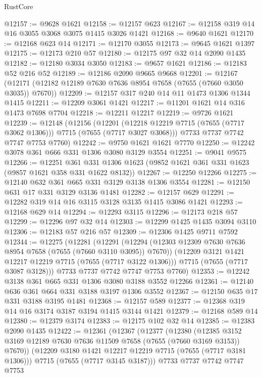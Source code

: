 \begin{lexlean}{RustCore}
\begin{coremodule}
@12157 := @9628 @1621
@12158 := @12157 @623
@12167 := @12158 @319 @14 @16 @3055 @3068 @3075 @1415 @3026 @1421
@12168 := @9640 @1621
@12170 := @12168 @623 @14
@12171 := @12170 @3055
@12173 := @9645 @1621 @1397
@12175 := @12173 @210 @57
@12180 := @12175 @97 @32 @14 @2090 @1435
@12182 := @12180 @3034 @3050
@12183 := @9657 @1621
@12186 := @12183 @52 @216 @52
@12189 := @12186 @2090 @9665 @9668
@12201 := @12167 (@12171 (@12182 @12189 @7630 @7636 @8954 @7658 (@7655 (@7660 @3050 @3035)) @7670))
@12209 := @12157 @317 @240 @14 @11 @1473 @1306 @1344 @1415
@12211 := @12209 @3061 @1421
@12217 := @11201 @1621 @14 @316 @1473 @7698 @7704
@12218 := @12211 @12217
@12219 := @9726 @1621
@12239 := @12148
    (@12156
      (@12201 (@12218 @12219 @7715 (@7655 (@7717 @3062 @1306))) @7715 (@7655 (@7717 @3027 @3068)))
      @7733
      @7737
      @7742
      @7747
      @7753
      @7760)
@12242 := @9750 @1621 @1621 @7770
@12250 := @12242 @3078 @361 @666 @331 @1306 @3080 @3129 @3554
@12251 := @9041 @9575
@12266 := @12251
    @361
    @331
    @1306
    @1623
    (@9852 @1621 @361 @331 @1623 (@9857 @1621 @358 @331 @1622 @8132))
@12267 := @12250 @12266
@12275 := @12140 @632 @361 @665 @331 @3129 @3138 @1306 @3554
@12281 := @12150 @631 @17 @331 @3129 @3136 @1481
@12282 := @12157 @629
@12291 := @12282 @319 @14 @16 @3115 @3128 @3135 @1415 @3086 @1421
@12293 := @12168 @629 @14
@12294 := @12293 @3115
@12296 := @12173 @218 @57
@12299 := @12296 @97 @32 @14
@12303 := @12299 @1425 @1435 @3094 @3110
@12306 := @12183 @57 @216 @57
@12309 := @12306 @1425 @9711 @7592
@12344 := @12275
    (@12281
      (@12291
        (@12294 (@12303 @12309 @7630 @7636 @8954 @7658 (@7655 (@7660 @3110 @3095)) @7670))
        (@12209 @3121 @1421 @12217 @12219 @7715 (@7655 (@7717 @3122 @1306)))
        @7715
        (@7655 (@7717 @3087 @3128)))
      @7733
      @7737
      @7742
      @7747
      @7753
      @7760)
@12353 := @12242 @3138 @361 @665 @331 @1306 @3080 @3188 @3552 @12266
@12361 := @12140 @636 @361 @664 @331 @3188 @3197 @1306 @3552
@12367 := @12150 @635 @17 @331 @3188 @3195 @1481
@12368 := @12157 @589
@12377 := @12368 @319 @14 @16 @3174 @3187 @3194 @1415 @3144 @1421
@12379 := @12168 @589 @14
@12380 := @12379 @3174
@12383 := @12175 @102 @32 @14
@12385 := @12383 @2090 @1435
@12422 := @12361
    (@12367
      (@12377
        (@12380
          (@12385 @3152 @3169 @12189 @7630 @7636 @11509 @7658 (@7655 (@7660 @3169 @3153)) @7670))
        (@12209 @3180 @1421 @12217 @12219 @7715 (@7655 (@7717 @3181 @1306)))
        @7715
        (@7655 (@7717 @3145 @3187)))
      @7733
      @7737
      @7742
      @7747
      @7753

\end{coremodule}
\end{lexlean}
